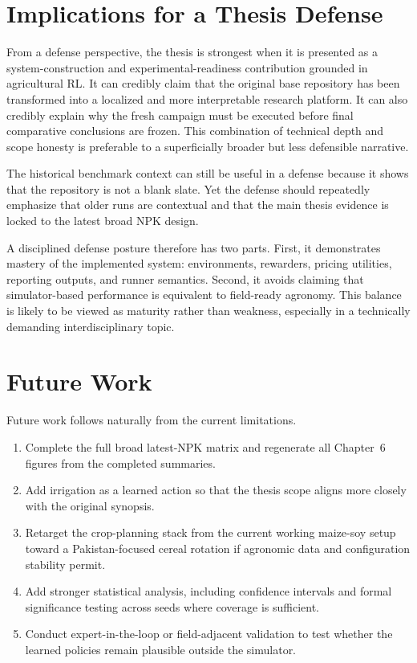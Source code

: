 \section{Implications for a Thesis Defense}

From a defense perspective, the thesis is strongest when it is presented as a system-construction and experimental-readiness contribution grounded in agricultural RL. It can credibly claim that the original base repository has been transformed into a localized and more interpretable research platform. It can also credibly explain why the fresh campaign must be executed before final comparative conclusions are frozen. This combination of technical depth and scope honesty is preferable to a superficially broader but less defensible narrative.

The historical benchmark context can still be useful in a defense because it shows that the repository is not a blank slate. Yet the defense should repeatedly emphasize that older runs are contextual and that the main thesis evidence is locked to the latest broad NPK design.

A disciplined defense posture therefore has two parts. First, it demonstrates mastery of the implemented system: environments, rewarders, pricing utilities, reporting outputs, and runner semantics. Second, it avoids claiming that simulator-based performance is equivalent to field-ready agronomy. This balance is likely to be viewed as maturity rather than weakness, especially in a technically demanding interdisciplinary topic.

\section{Future Work}

Future work follows naturally from the current limitations.
\begin{enumerate}[leftmargin=1.2cm]
    \item Complete the full broad latest-NPK matrix and regenerate all Chapter~6 figures from the completed summaries.
    \item Add irrigation as a learned action so that the thesis scope aligns more closely with the original synopsis.
    \item Retarget the crop-planning stack from the current working maize-soy setup toward a Pakistan-focused cereal rotation if agronomic data and configuration stability permit.
    \item Add stronger statistical analysis, including confidence intervals and formal significance testing across seeds where coverage is sufficient.
    \item Conduct expert-in-the-loop or field-adjacent validation to test whether the learned policies remain plausible outside the simulator.
\end{enumerate}

